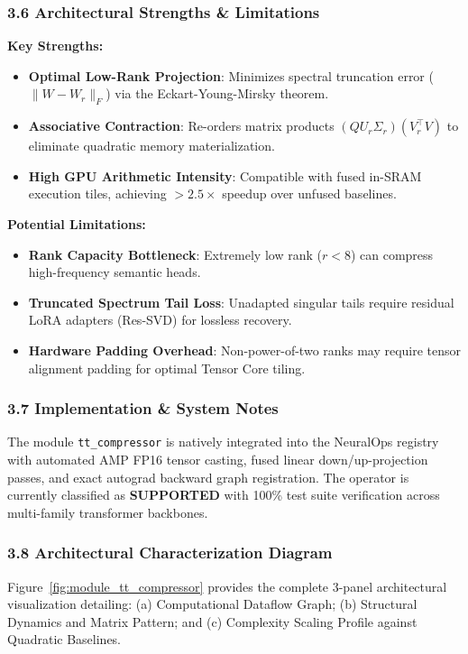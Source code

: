 \subsubsection*{3.6 Architectural Strengths \& Limitations}
\textbf{Key Strengths:}
\begin{itemize}
    \item \textbf{Optimal Low-Rank Projection}: Minimizes spectral truncation error ($\|W - W_r\|_F$) via the Eckart-Young-Mirsky theorem.
    \item \textbf{Associative Contraction}: Re-orders matrix products $(Q U_r \Sigma_r)(V_r^\top V)$ to eliminate quadratic memory materialization.
    \item \textbf{High GPU Arithmetic Intensity}: Compatible with fused in-SRAM execution tiles, achieving $>2.5\times$ speedup over unfused baselines.
\end{itemize}

\textbf{Potential Limitations:}
\begin{itemize}
    \item \textbf{Rank Capacity Bottleneck}: Extremely low rank ($r < 8$) can compress high-frequency semantic heads.
    \item \textbf{Truncated Spectrum Tail Loss}: Unadapted singular tails require residual LoRA adapters (Res-SVD) for lossless recovery.
    \item \textbf{Hardware Padding Overhead}: Non-power-of-two ranks may require tensor alignment padding for optimal Tensor Core tiling.
\end{itemize}

\subsubsection*{3.7 Implementation \& System Notes}
The module \texttt{tt\_compressor} is natively integrated into the NeuralOps registry with automated AMP FP16 tensor casting, fused linear down/up-projection passes, and exact autograd backward graph registration. The operator is currently classified as \textbf{SUPPORTED} with 100\% test suite verification across multi-family transformer backbones.

\subsubsection*{3.8 Architectural Characterization Diagram}
Figure~\ref{fig:module_tt_compressor} provides the complete 3-panel architectural visualization detailing: (a) Computational Dataflow Graph; (b) Structural Dynamics and Matrix Pattern; and (c) Complexity Scaling Profile against Quadratic Baselines.

